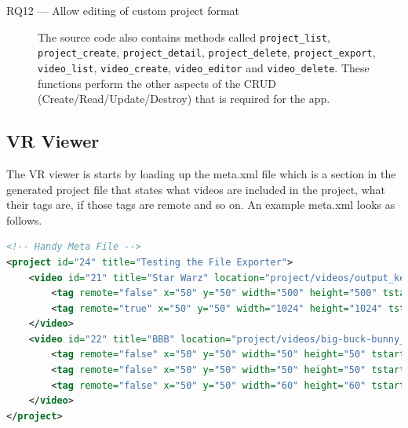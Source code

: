 \documentclass[12pt]{report}
\newcommand{\inlinecode}{\texttt}
\begin{document}
\begin{description}
 \item[RQ12 --- Allow editing of custom project format] The source code also contains methods called \inlinecode{project\_list}, \inlinecode{project\_create}, \inlinecode{project\_detail}, \inlinecode{project\_delete}, \inlinecode{project\_export}, \inlinecode{video\_list}, \inlinecode{video\_create}, \inlinecode{video\_editor} and \inlinecode{video\_delete}. These functions perform the other aspects of the CRUD (Create/Read/Update/Destroy) that is required for the app.
\end{description}

\subsection{VR Viewer}
The VR viewer is starts by loading up the meta.xml file which is a section in the generated project file that states what videos are included in the project, what their tags are, if those tags are remote and so on. An example meta.xml looks as follows.

\begin{lstlisting}[language=XML, breaklines=true]
<!-- Handy Meta File -->
<project id="24" title="Testing the File Exporter">
    <video id="21" title="Star Warz" location="project/videos/output_ke4Kqgg.webm">
        <tag remote="false" x="50" y="50" width="500" height="500" tstart="55" tend="60" local_content="Dod Gamn Stormtroopers"/>
        <tag remote="true" x="50" y="50" width="1024" height="1024" tstart="62" tend="72" remote_url="www.google.com/?q=Darth"/>
    </video>
    <video id="22" title="BBB" location="project/videos/big-buck-bunny_trailer_9RD0r16.webm">
        <tag remote="false" x="50" y="50" width="50" height="50" tstart="5" tend="7" local_content="Tree"/>
        <tag remote="false" x="50" y="50" width="50" height="50" tstart="10" tend="11" local_content="Bunny"/>
        <tag remote="false" x="50" y="50" width="60" height="60" tstart="18" tend="23" local_content="You done goofed"/>
    </video>
</project>
\end{lstlisting}
\end{document}
